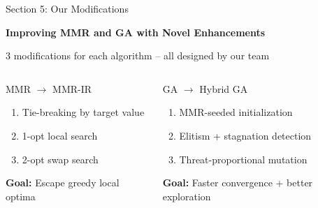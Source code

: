 \documentclass[aspectratio=43,8pt]{beamer}
\begin{document}
\begin{frame}{Section 5: Our Modifications}
\begin{center}
{\Large\textcolor{primaryblue}{\textbf{Improving MMR and GA with Novel Enhancements}}}

\vspace{0.5cm}
{\normalsize 3 modifications for each algorithm -- all designed by our team}
\end{center}

\vspace{0.3cm}
\begin{columns}[t]
\begin{block}{MMR $\rightarrow$ MMR-IR}
\begin{enumerate}
    \item Tie-breaking by target value
    \item 1-opt local search
    \item 2-opt swap search
\end{enumerate}
{\small \textbf{Goal:} Escape greedy local optima}
\end{block}

\begin{alertblock}{GA $\rightarrow$ Hybrid GA}
\begin{enumerate}
    \item MMR-seeded initialization
    \item Elitism + stagnation detection
    \item Threat-proportional mutation
\end{enumerate}
{\small \textbf{Goal:} Faster convergence + better exploration}
\end{alertblock}
\end{columns}
\end{frame}
\end{document}
